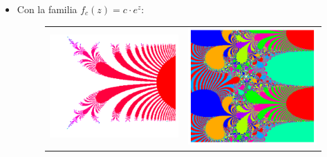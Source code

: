 \begin{itemize}
\item Con la familia $f_c(z)=c\cdot e^z$:
  
\begin{figure}[ht]
  \centering
  \begin{tabular}{cc}
    \includegraphics[scale=0.45]{./img/C3/juliaE-1.png} &   \includegraphics[scale=0.45]{./img/C3/juliaE-2.png}
  \end{tabular}
\end{figure}

\end{itemize}